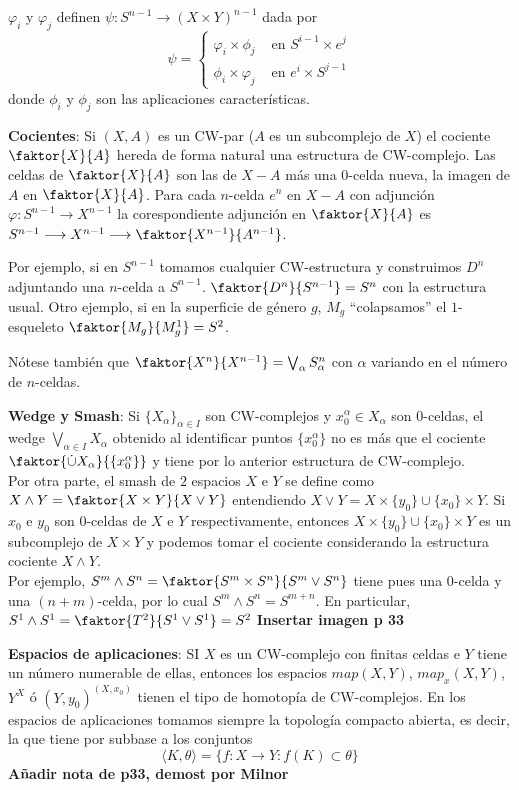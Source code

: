 $\varphi_i$ y $\varphi_j$ definen $\psi : S^{n-1} \longrightarrow (X \times Y)^{n-1}$ dada por 
\[ \psi = \begin{cases}
\varphi_i  \times \phi_j & \text{ en } S^{i-1} \times e^j \\
\phi_i \times \varphi_j & \text{ en } e^i \times S^{j-1}
\end{cases} \]
donde $\phi_i$ y $\phi_j$ son las aplicaciones características. \par 
\textbf{Cocientes}: Si $(X, A)$ es un CW-par ($A$ es un subcomplejo de $X$) el cociente $\faktor{X}{A}$ hereda de forma natural una estructura de CW-complejo. Las celdas de $\faktor{X}{A}$ son las de $X - A$ más una $0$-celda nueva, la imagen de $A$ en $\faktor{X}{A}$. Para cada $n$-celda $e^n$ en $X - A$ con adjunción $\varphi : S^{n-1} \longrightarrow X^{n-1}$ la corespondiente adjunción en $\faktor{X}{A}$ es $S^{n-1} \longrightarrow X^{n-1} \longrightarrow \faktor{X^{n-1}}{A^{n-1}}$. \par
Por ejemplo, si en $S^{n-1}$ tomamos cualquier CW-estructura y construimos $D^n$ adjuntando una $n$-celda a $S^{n-1}$. $\faktor{D^n}{S^{n-1}} = S^n$ con la estructura usual. Otro ejemplo, si en la superficie de género $g$, $M_g$ ``colapsamos'' el $1$-esqueleto $\faktor{M_g}{M_g^1} = S^2$. \par 
Nótese también que $\faktor{X^n}{X^{n-1}} = \bigvee_\alpha S_\alpha^n$ con $\alpha$ variando en el número de $n$-celdas. \par 
\textbf{Wedge y Smash}: Si $\{X_\alpha \}_{\alpha \in I}$ son CW-complejos y $x_0^\alpha \in X_\alpha$  son $0$-celdas, el wedge $\bigvee_{\alpha \in I} X_\alpha$ obtenido al identificar puntos $\{x_0^\alpha \}$ no es más que el cociente $\faktor{\dot{\cup} X_\alpha}{\{x_0^\alpha\}}$ y tiene por lo anterior estructura de CW-complejo. \\
Por otra parte, el smash de $2$ espacios $X$ e $Y$  se define como $X \wedge Y = \faktor{X \times Y}{X \vee Y}$ entendiendo $X \vee Y = X \times \{y_0\} \cup \{x_0\} \times Y$. Si $x_0$ e $y_0$ son $0$-celdas de $X$ e $Y$ respectivamente, entonces $X \times \{y_0\} \cup \{x_0\} \times Y$ es un subcomplejo de $X \times Y$ y podemos tomar el cociente considerando la estructura cociente $X \wedge Y$. \\
Por ejemplo, $S^m \wedge S^n = \faktor{S^m \times S^n}{S^m \vee S^n}$ tiene pues una $0$-celda y una $(n+m)$-celda, por lo cual $S^m \wedge S^n = S^{m+n}$. En particular, $S^1 \wedge S^1 = \faktor{T^2}{S^1 \vee S^1} = S^2$ \textbf{Insertar imagen p 33} \par 
\textbf{Espacios de aplicaciones}: SI $X$ es un CW-complejo con finitas celdas e $Y$ tiene un número numerable de ellas, entonces los espacios
$map(X,Y)$, $map_x(X,Y)$, $Y^X$ ó $(Y, y_0)^{(X, x_0)}$ tienen el tipo de homotopía de CW-complejos. En los espacios de aplicaciones tomamos siempre la topología compacto abierta, es decir, la que tiene por subbase a los conjuntos 
\[ \langle K, \theta \rangle = \{f:X \longrightarrow Y : f(K) \subset \theta \} \]
\textbf{Añadir nota de p33, demost por Milnor}